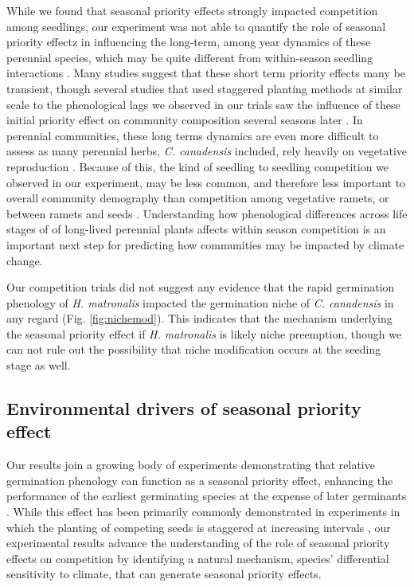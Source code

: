 \documentclass{article}\usepackage[]{graphicx}\usepackage[]{color}
\begin{document}
While we found that seasonal priority effects strongly impacted competition among seedlings, our experiment was not able to quantify the role of seasonal priority effectz in influencing the long-term, among year dynamics of these perennial species, which may be quite different from within-season seedling interactions \citep{}. Many studies suggest that these short term priority effects many be transient, though several studies that used staggered planting methods at similar scale to the phenological lags we observed in our trials saw the influence of these initial priority effect on community composition several seasons later \citep{Weidlich:2020aa}.  In perennial communities, these long terms dynamics are even more difficult to assess as many perennial herbs, \textit{C. canadensis} included, rely heavily on vegetative reproduction \citep{Hawkins:2005ve}. Because of this, the kind of seedling to seedling competition we observed in our experiment, may be less common, and therefore less important to overall community demography than competition among vegetative ramets, or between ramets and seeds \citep{}. Understanding how phenological differences across life stages of of long-lived perennial plants affects within season competition is an important next step for predicting how communities may be impacted by climate change.

Our competition trials did not suggest any evidence that the rapid germination phenology of \textit{H. matronalis} impacted the germination niche of \textit{C. canadensis} in any regard (Fig. \ref{fig:nichemod}). This indicates that the mechanism underlying the seasonal priority effect if \textit{H. matronalis} is likely niche preemption, though we can not rule out the possibility that niche modification occurs at the seeding stage as well. %

\subsection*{Environmental drivers of seasonal priority effect}
Our results join a growing body of experiments demonstrating that relative germination phenology can function as a seasonal priority effect, enhancing the performance of the earliest germinating species at the expense of later germinants \citep{Korner2008,Dickson2012,Ross1972}. While this effect has been primarily commonly demonstrated in experiments in which the planting of competing seeds is staggered at increasing intervals \citep{Young:2017aa,Weidlich:2020aa}, our experimental results advance the understanding of the role of seasonal priority effects on competition by identifying a natural mechanism, species' differential sensitivity to climate, that can generate seasonal priority effects.
\end{document}
